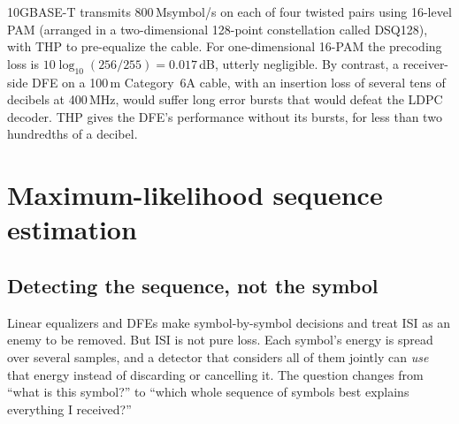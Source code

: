 \begin{worked}
10GBASE-T transmits 800\,Msymbol/s on each of four twisted pairs using 16-level PAM (arranged in a
two-dimensional 128-point constellation called DSQ128), with THP to pre-equalize the cable. For
one-dimensional 16-PAM the precoding loss is $10\log_{10}(256/255)=0.017$\,dB, utterly negligible. By
contrast, a receiver-side DFE on a 100\,m Category~6A cable, with an insertion loss of several tens
of decibels at 400\,MHz, would suffer long error bursts that would defeat the LDPC decoder. THP gives
the DFE's performance without its bursts, for less than two hundredths of a decibel.
\end{worked}


\section{Maximum-likelihood sequence estimation}
\label{sec:ch12:mlse}

\subsection{Detecting the sequence, not the symbol}

Linear equalizers and DFEs make symbol-by-symbol decisions and treat ISI as an enemy to be removed.
But ISI is not pure loss. Each symbol's energy is spread over several samples, and a detector that
considers all of them jointly can \emph{use} that energy instead of discarding or cancelling it.
The question changes from ``what is this symbol?'' to ``which whole sequence of symbols best explains
everything I received?''

